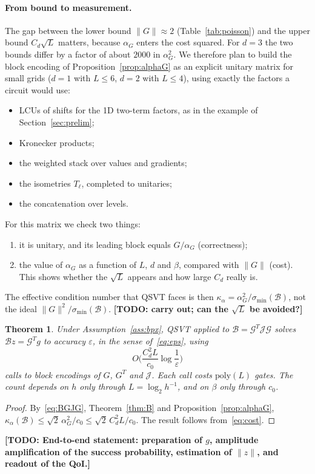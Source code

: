 \documentclass[11pt,a4paper]{article}
\newcommand{\B}{\mathcal{B}}
\newcommand{\G}{\mathcal{G}}
\newcommand{\J}{\mathcal{J}}
\newcommand{\todo}[1]{\textbf{[TODO: #1]}}
\newtheorem{theorem}{Theorem}[section]
\theoremstyle{remark}
\begin{document}
\paragraph{From bound to measurement.} The gap between the lower bound
$\|G\|\approx2$ (Table~\ref{tab:poisson}) and the upper bound $C_d\sqrt L$ matters,
because $\alpha_G$ enters the cost squared. For $d=3$ the two bounds differ by
a factor of about $2000$ in $\alpha_G^2$. We therefore plan to build the block
encoding of Proposition~\ref{prop:alphaG} as an explicit unitary matrix
for small grids ($d=1$ with $L\le6$, $d=2$ with $L\le4$), using exactly the
factors a circuit would use:
\begin{itemize}
\item LCUs of shifts for the 1D two-term factors, as in the example of
  Section~\ref{sec:prelim};
\item Kronecker products;
\item the weighted stack over values and gradients;
\item the isometries $T_\ell$, completed to unitaries;
\item the concatenation over levels.
\end{itemize}
For this matrix we check two things:
\begin{enumerate}
\item it is unitary, and its leading block equals $G/\alpha_G$ (correctness);
\item the value of $\alpha_G$ as a function of $L$, $d$ and $\beta$, compared with
  $\|G\|$ (cost). This shows whether the $\sqrt L$ appears and how large $C_d$
  really is.
\end{enumerate}
The effective condition number that QSVT faces is then
$\kappa_\alpha=\alpha_G^2/\sigma_{\min}(\B)$, not the ideal $\|G\|^2/\sigma_{\min}(\B)$.
\todo{carry out; can the $\sqrt L$ be avoided?}

\begin{theorem}\label{thm:main}
Under Assumption~\ref{ass:bpx}, QSVT applied to $\B=\G^T\J\G$ solves
$\B z=\G^Tg$ to accuracy $\varepsilon$, in the sense of~\eqref{eq:eps}, using
\[
O\Big(\frac{C_d^2L}{c_0}\log\frac1\varepsilon\Big)
\]
calls to block encodings of $G$, $G^T$ and $\J$. Each call costs
$\mathrm{poly}(L)$ gates. The count depends on $h$ only through $L=\log_2h^{-1}$, and
on $\beta$ only through $c_0$.
\end{theorem}
\begin{proof}
By~\eqref{eq:BGJG}, Theorem~\ref{thm:B} and Proposition~\ref{prop:alphaG},
$\kappa_\alpha(\B)\le\sqrt2\,\alpha_G^2/c_0\le\sqrt2\,C_d^2L/c_0$. The result follows
from~\eqref{eq:cost}.
\end{proof}
\noindent\todo{End-to-end statement: preparation of $g$, amplitude
amplification of the success probability, estimation of $\|z\|$, and readout
of the QoI.}
\end{document}
